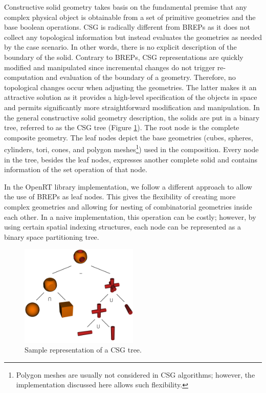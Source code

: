 \documentclass[a4paper,11pt,oneside]{article}
\begin{document}
Constructive solid geometry takes basis on the fundamental premise that any complex physical object is obtainable from a set of primitive geometries and the base boolean operations. CSG is radically different from BREPs as it does not collect any topological information but instead evaluates the geometries as needed by the case scenario. In other words, there is no explicit description of the boundary of the solid. Contrary to BREPs,  CSG representations are quickly modified and manipulated since incremental changes do not trigger re-computation and evaluation of the boundary of a geometry. Therefore, no topological changes occur when adjusting the geometries. The latter makes it an attractive solution as it provides a high-level specification of the objects in space and permits significantly more straightforward modification and manipulation. In the general constructive solid geometry description, the solids are put in a binary tree, referred to as the CSG tree (Figure \ref{sec3.1:sample-csg-tree}). The root node is the complete composite geometry. The leaf nodes depict the base geometries (cubes, spheres, cylinders, tori, cones, and polygon meshes\footnote{Polygon meshes are usually not considered in CSG algorithms; however, the implementation discussed here allows such flexibility.}) used in the composition. Every node in the tree, besides the leaf nodes, expresses another complete solid and contains information of the set operation of that node.
    
In the OpenRT library implementation, we follow a different approach to allow the use of BREPs as leaf nodes. This gives the flexibility of creating more complex geometries and allowing for nesting of combinatorial geometries inside each other. In a naive implementation, this operation can be costly; however, by using certain spatial indexing structures, each node can be represented as a binary space partitioning tree.
  
\begin{figure}[ht]
	\begin{center}
		\includegraphics[width=0.5\textwidth]{section1/sample-csg-tree.png}
	\end{center}
	\caption{Sample representation of a CSG tree.}
	\label{sec3.1:sample-csg-tree}
\end{figure}
  
\end{document}
